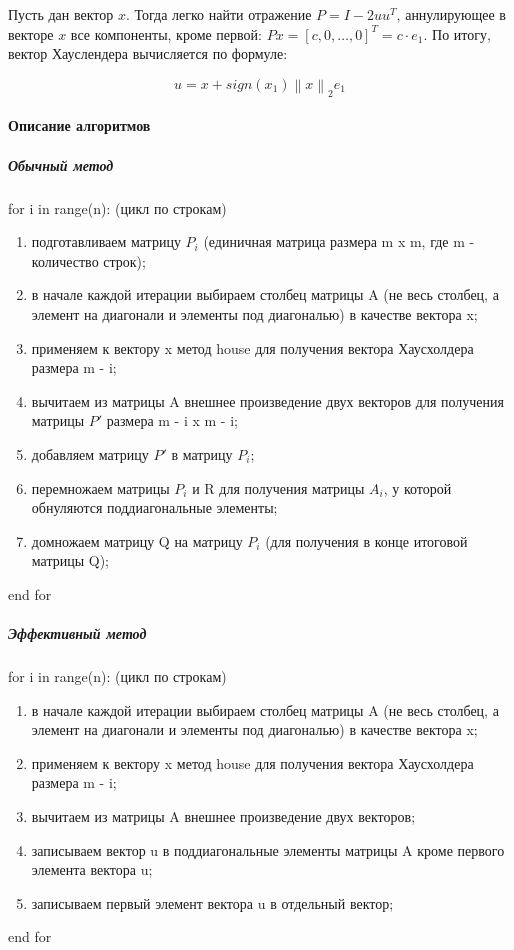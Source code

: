 \documentclass[a4paper]{article}
\begin{document}
Пусть дан вектор $x$. Тогда легко найти отражение $P = I - 2uu^T$, аннулирующее в векторе $x$ все компоненты, кроме первой: $Px = \left [c, 0, \ldots,0  \right ]^T = c \cdot e_1$. По итогу, вектор Хауслендера вычисляется по формуле:

\begin{equation*}
u = x + sign(x_1) \left \| x \right \|_2 e_1
\end{equation*}

\newpage

\paragraph{Описание алгоритмов}

\subparagraph{Обычный метод}

for i in range(n): (цикл по строкам)
\begin{enumerate}
\item подготавливаем матрицу $P_i$ (единичная матрица размера m x m, где m - количество строк);
\item в начале каждой итерации выбираем столбец матрицы A (не весь столбец, а элемент на диагонали и элементы под диагональю) в качестве вектора x;
\item применяем к вектору x метод house для получения вектора Хаусхолдера размера m - i;
\item вычитаем из матрицы A внешнее произведение двух векторов для получения матрицы ${P}'$ размера m - i x m - i;
\item добавляем матрицу ${P}'$ в матрицу $P_i$;
\item перемножаем матрицы $P_i$ и R для получения матрицы $A_i$, у которой обнуляются поддиагональные элементы;
\item домножаем матрицу Q на матрицу $P_i$ (для получения в конце итоговой матрицы Q);
\end{enumerate}
end for

\subparagraph{Эффективный метод}


for i in range(n): (цикл по строкам)
\begin{enumerate}
\item в начале каждой итерации выбираем столбец матрицы A (не весь столбец, а элемент на диагонали и элементы под диагональю) в качестве вектора x;
\item применяем к вектору x метод house для получения вектора Хаусхолдера размера m - i;
\item вычитаем из матрицы A внешнее произведение двух векторов;
\item записываем вектор u в поддиагональные элементы матрицы A кроме первого элемента вектора u;
\item записываем первый элемент вектора u в отдельный вектор;
\end{enumerate}
end for
\end{document}
